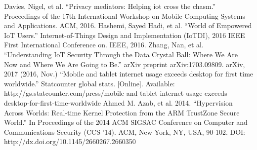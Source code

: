  Davies, Nigel, et al. ``Privacy mediators: Helping iot cross the chasm.'' Proceedings of the 17th International Workshop on Mobile Computing Systems and Applications. ACM, 2016.
 Hashemi, Sayed Hadi, et al. ``World of Empowered IoT Users.'' Internet-of-Things Design and Implementation (IoTDI), 2016 IEEE First International Conference on. IEEE, 2016.
 Zhang, Nan, et al. ``Understanding IoT Security Through the Data Crystal Ball: Where We Are Now and Where We Are Going to Be.'' arXiv preprint arXiv:1703.09809. arXiv, 2017
 (2016, Nov.) ``Mobile and tablet internet usage exceeds desktop for first time worldwide.'' Statcounter global stats. [Online]. Available: http://gs.statcounter.com/press/mobile-and-tablet-internet-usage-exceeds-desktop-for-first-time-worldwide
 Ahmed M. Azab, et al. 2014. ``Hypervision Across Worlds: Real-time Kernel Protection from the ARM TrustZone Secure World.'' In Proceedings of the 2014 ACM SIGSAC Conference on Computer and Communications Security (CCS '14). ACM, New York, NY, USA, 90-102. DOI: http://dx.doi.org/10.1145/2660267.2660350